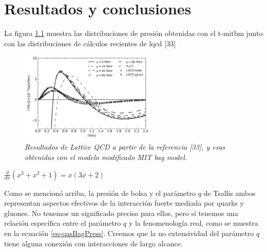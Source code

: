 \chapter{Resultados y conclusiones}

La figura \ref{fig: Results} muestra las distribuciones de presión obtenidas con el \acrshort{t-mitbm} junto con las distribuciones de cálculos recientes de \acrshort{lqcd} [33]

\begin{figure}
\centering
\includegraphics[width=0.58\textwidth]{./Images/MIT-BagModel.png}
\caption[MIT-Bag model]{\emph{Resultados de Lattice QCD a partir de la referencia [33], y esas obtenidas con el modelo modificado MIT bag model.}}
\label{fig: Results}
\end{figure}

$\frac{d}{dx}(x^3+x^2+1) = x (3 x + 2)$

Como se mencionó arriba, la presión de bolsa y el parámetro $q$ de Tsallis ambos representan aspectos efectivos de la interacción fuerte mediada por quarks y gluones. No tenemos un significado preciso para ellos, pero sí tenemos una relación específica entre el parámetro $q$ y la fenomenología real, como se muestra en la ecuación \eqref{eq-qasBagPress}. Creemos que la no extensividad del parámetro $q$ tiene alguna conexión con interacciones de largo alcance.

